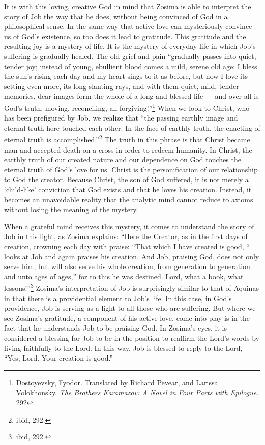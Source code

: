 It is with this loving, creative God in mind that Zosima is able to interpret the story of Job the way that  he does, without being convinced of God in a philosophical sense. In the same way that active love can mysteriously convince us of God's existence, so too does it lead to gratitude. This gratitude and the resulting joy is a mystery of life.  It is the mystery of everyday life in which Job's suffering is gradually healed. The old grief and pain ``gradually passes into quiet, tender joy; instead of young, ebullient blood comes a mild, serene old age: I bless the sun's rising each day and my heart sings to it as before, but now I love its setting even more, its long slanting rays, and with them quiet, mild, tender memories, dear images form the whole of a long and blessed life --- and over all is God's truth, moving, reconciling, all-forgiving!''\footnote{Dostoyevsky, Fyodor. Translated by Richard Pevear, and Larissa Volokhonsky. \emph{The Brothers Karamazov: A Novel in Four Parts with Epilogue}. 292} When we look to Christ, who has been prefigured by Job, we realize that ``the passing earthly image and eternal truth here touched each other. In the face of earthly truth, the enacting of eternal truth is accomplished.''\footnote{ibid, 292.}  The truth in this phrase is that Christ became man and accepted death on a cross in order to redeem humanity.  In Christ, the earthly truth of our created nature and our dependence on God touches the eternal truth of God's love for us.  Christ is the personification of our relationship to God the creator.  Because Christ, the son of God suffered, it is not merely a `child-like' conviction that God exists and that he loves his creation. Instead, it becomes an unavoidable reality that the analytic mind cannot reduce to axioms without losing the meaning of the mystery.

When a grateful mind receives this mystery, it comes to understand the story of Job in this light, as Zosima explains: ``Here the Creator, as in the first days of creation, crowning each day with praise: ``That which I have created is good, `` looks at Job and again praises his creation. And Job, praising God, does not only serve him, but will also serve his whole creation, from generation to generation and unto ages of ages,'' for to this he was destined. Lord, what a book, what lessons!''\footnote{ibid, 292.} Zosima's interpretation of Job is surprisingly similar to that of Aquinas in that there is a providential element to Job's life. In this case, in God's providence, Job is serving as a light to all those who are suffering. But where we see Zosima's gratitude, a component of his active love, come into play is in the fact that he understands Job to be praising God. In Zosima's eyes, it is considered a blessing for Job to be in the position to reaffirm the Lord's words by living faithfully to the Lord. In this way, Job is blessed to reply to the Lord, ``Yes, Lord. Your creation is good.''
